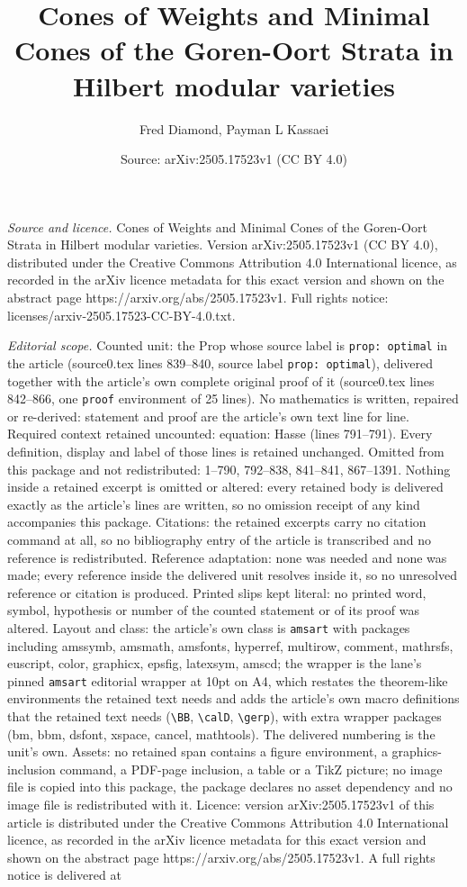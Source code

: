 \documentclass[10pt,a4paper]{amsart}
\title[Cones of Weights and Minimal Cones of the Goren-Oort Strata ]{Cones of Weights and Minimal Cones of the Goren-Oort Strata in Hilbert modular varieties}
\author{Fred Diamond, Payman L Kassaei}
\date{Source: arXiv:2505.17523v1 (CC BY 4.0)}
\begin{document}
\maketitle

\noindent\emph{Source and licence.} Cones of Weights and Minimal Cones of the Goren-Oort Strata in Hilbert modular varieties. Version arXiv:2505.17523v1 (CC BY 4.0), distributed under the Creative Commons Attribution 4.0 International licence, as recorded in the arXiv licence metadata for this exact version and shown on the abstract page https://arxiv.org/abs/2505.17523v1. Full rights notice: licenses/arxiv-2505.17523-CC-BY-4.0.txt.\par\smallskip

\noindent\textit{Editorial scope.} Counted unit: the Prop whose source label is \texttt{prop: optimal} in the article (source0.tex lines 839--840, source label \texttt{prop: optimal}), delivered together with the article's own complete original proof of it (source0.tex lines 842--866, one \texttt{proof} environment of 25 lines). No mathematics is written, repaired or re-derived: statement and proof are the article's own text line for line. Required context retained uncounted: equation: Hasse (lines 791--791). Every definition, display and label of those lines is retained unchanged. Omitted from this package and not redistributed: 1--790, 792--838, 841--841, 867--1391. Nothing inside a retained excerpt is omitted or altered: every retained body is delivered exactly as the article's lines are written, so no omission receipt of any kind accompanies this package. Citations: the retained excerpts carry no citation command at all, so no bibliography entry of the article is transcribed and no reference is redistributed. Reference adaptation: none was needed and none was made; every reference inside the delivered unit resolves inside it, so no unresolved reference or citation is produced. Printed slips kept literal: no printed word, symbol, hypothesis or number of the counted statement or of its proof was altered. Layout and class: the article's own class is \texttt{amsart} with packages including amssymb, amsmath, amsfonts, hyperref, multirow, comment, mathrsfs, euscript, color, graphicx, epsfig, latexsym, amscd; the wrapper is the lane's pinned \texttt{amsart} editorial wrapper at 10pt on A4, which restates the theorem-like environments the retained text needs and adds the article's own macro definitions that the retained text needs (\texttt{\textbackslash BB}, \texttt{\textbackslash calD}, \texttt{\textbackslash gerp}), with extra wrapper packages (bm, bbm, dsfont, xspace, cancel, mathtools). The delivered numbering is the unit's own. Assets: no retained span contains a figure environment, a graphics-inclusion command, a PDF-page inclusion, a table or a TikZ picture; no image file is copied into this package, the package declares no asset dependency and no image file is redistributed with it. Licence: version arXiv:2505.17523v1 of this article is distributed under the Creative Commons Attribution 4.0 International licence, as recorded in the arXiv licence metadata for this exact version and shown on the abstract page https://arxiv.org/abs/2505.17523v1. A full rights notice is delivered at 
\end{document}
